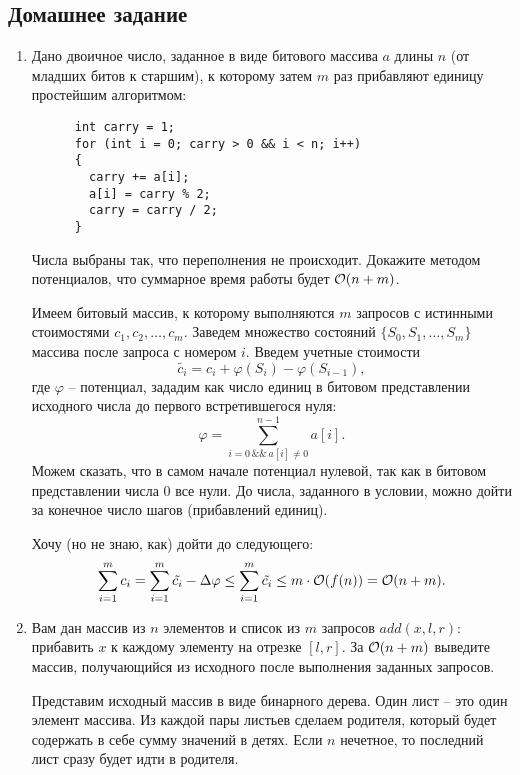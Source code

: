 \subsection{Домашнее задание}
\begin{enumerate}

  \item
    Дано двоичное число, заданное в виде битового массива $a$ длины $n$ (от младших битов к старшим), к которому
    затем $m$ раз прибавляют единицу простейшим алгоритмом:
    \begin{lstlisting}
      int carry = 1;
      for (int i = 0; carry > 0 && i < n; i++)
      {
        carry += a[i];
        a[i] = carry % 2;
        carry = carry / 2;
      }
    \end{lstlisting}
    Числа выбраны так, что переполнения не происходит. Докажите методом потенциалов, что суммарное время
    работы будет $\mathcal{O}(n + m)$.
    \begin{solution}
      Имеем битовый массив, к которому выполняются $m$ запросов с истинными стоимостями $c_1, c_2, \ldots, c_m$. Заведем множество состояний $\{S_0, S_1, \ldots, S_m\}$ массива после запроса с номером $i$. Введем учетные стоимости
      \begin{equation}
        \tilde{c_i} = c_i + \varphi(S_i) - \varphi(S_{i-1}),
      \end{equation}
      где $\varphi$ -- потенциал, зададим как число единиц в битовом представлении исходного числа до первого встретившегося нуля:
      \begin{equation}
        \varphi = \sum_{i = 0\, \&\&\, a[i] \neq 0}^{n - 1} a[i].
      \end{equation}
      Можем сказать, что в самом начале потенциал нулевой, так как в битовом представлении числа 0 все нули. До числа, заданного в условии, можно дойти за конечное число шагов (прибавлений единиц).

      Хочу (но не знаю, как) дойти до следующего:
      \begin{equation}
        \sum_{i = 1}^{m} c_i = \sum_{i = 1}^{m} \tilde{c_i} - \Delta \varphi \leq \sum_{i = 1}^{m} \tilde{c_i} \leq m \cdot \mathcal{O}(f(n)) = \mathcal{O}(n + m).
      \end{equation}
    \end{solution}

  \item
    Вам дан массив из $n$ элементов и
    список из $m$ запросов $add(x, l, r)$: прибавить $x$ к каждому
    элементу на отрезке $[l, r]$. За $\mathcal{O}(n + m)$ выведите массив,
    получающийся из исходного после выполнения заданных запросов.
    \begin{solution}
      Представим исходный массив в виде бинарного дерева. Один лист -- это один элемент массива. Из каждой пары листьев сделаем родителя, который будет содержать в себе сумму значений в детях. Если $n$ нечетное, то последний лист сразу будет идти в родителя.
      

\end{solution}
\end{enumerate}
